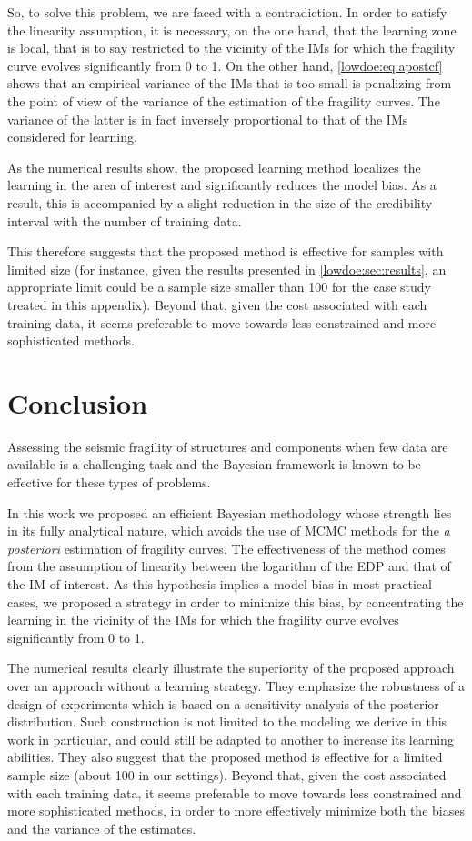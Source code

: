 So, to solve this problem, we are faced with a contradiction. In order to satisfy the linearity assumption, it is necessary, on the one hand, that the learning zone is local, that is to say restricted to the vicinity of the IMs for which the fragility curve evolves significantly from 0 to 1. On the other hand, \cref{lowdoe:eq:apostcf} shows that an empirical variance of the IMs that is too small is penalizing from the point of view of the variance of the estimation of the fragility curves. The variance of the latter is in fact inversely proportional to that of the IMs considered for learning.

As the numerical results show, the proposed learning method localizes the learning in the area of interest and significantly reduces the model bias. As a result, this is accompanied by a slight reduction in the size of the credibility interval with the number of training data.

This therefore suggests that the proposed method is effective for samples
with limited size (for instance, given the results presented in \cref{lowdoe:sec:results}, an appropriate limit could be a sample size smaller than 100 for the case study treated in this appendix). Beyond that, given the cost associated with each training data, it seems preferable to move towards less constrained and more sophisticated methods.

\section{Conclusion}\label{lowdoe:sec:conclusion}

Assessing the seismic fragility of structures and components when few data are available is a challenging task and the Bayesian framework is known to be effective for these types of problems.

In this work we proposed an efficient Bayesian methodology whose strength lies in its fully analytical nature, which avoids the use of MCMC methods for the \emph{a posteriori} estimation of fragility curves.
The effectiveness of the method comes from the assumption of linearity between the logarithm of the EDP and that of the IM of interest. As this hypothesis implies a model bias in most practical cases, we proposed a strategy in order to minimize this bias, by concentrating the learning in the vicinity of the IMs for which the fragility curve evolves significantly from 0 to 1.

The numerical results clearly illustrate the superiority of the proposed approach over an approach without a learning strategy. 
They emphasize the robustness of a design of experiments which is based on a sensitivity analysis of the posterior distribution.
 Such construction is not limited to the modeling we derive in this work in particular, and could still be adapted to another to increase its learning abilities. 
They also suggest that the proposed method is effective for a limited sample size (about 100 in our settings). Beyond that, given the cost associated with each training data, it seems preferable to move towards less constrained and more sophisticated methods, in order to more effectively minimize both the biases and the variance of the estimates.

